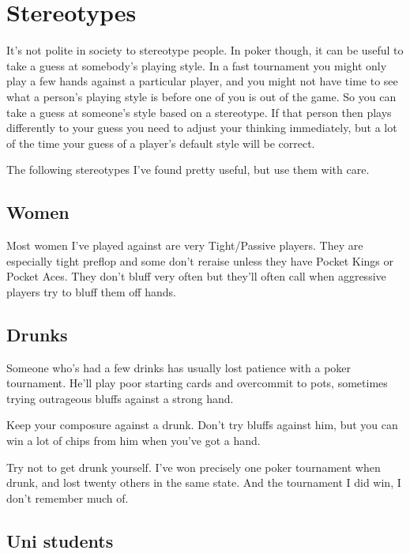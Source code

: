 \chapter{Stereotypes}


It's not polite in society to stereotype people. In poker though,
it can be useful to take a guess at somebody's playing style.
In a fast tournament you might only play a few hands against
a particular player, and you might not have time to see
what a person's playing style is before one of you is out
of the game. So you can take a guess at someone's style based
on a stereotype. If that person then plays differently to your guess
you need to adjust your thinking immediately, but a lot of the
time your guess of a player's default style will be correct.

The following stereotypes I've found pretty useful, but use them
with care.

\section{Women}

Most women I've played against are very Tight/Passive players. They
are especially tight preflop and some don't reraise unless they have
Pocket Kings or Pocket Aces. They don't bluff very often but they'll
often call when aggressive players try to bluff them off hands.

\section{Drunks}

Someone who's had a few drinks has usually lost patience with a poker
tournament.  He'll play poor starting cards and overcommit to pots, sometimes
trying outrageous bluffs against a strong hand.

Keep your composure against a drunk. Don't try bluffs against him, but you
can win a lot of chips from him when you've got a hand.

Try not to get drunk yourself. I've won precisely one poker tournament
when drunk, and lost twenty others in the same state. And the
tournament I did win, I don't remember much of.


\section{Uni students}

